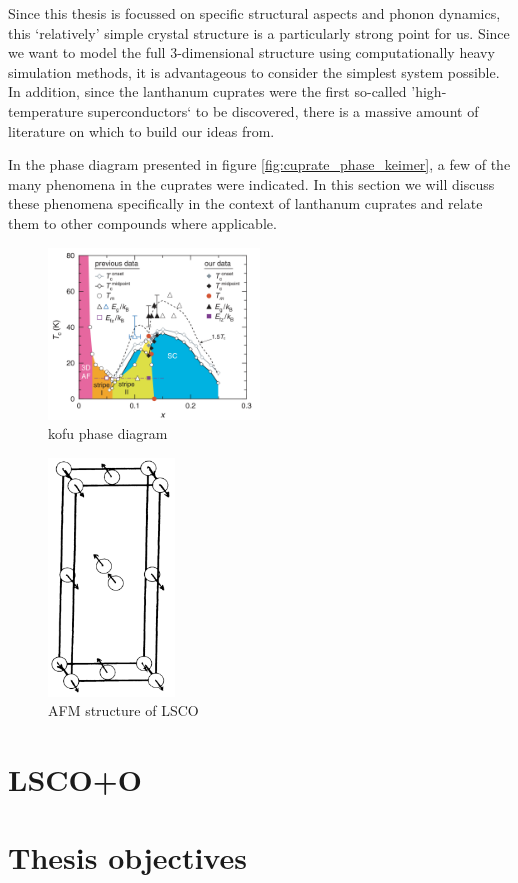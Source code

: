 Since this thesis is focussed on specific structural aspects and phonon dynamics, this `relatively' simple crystal structure is a particularly strong point for us. Since we want to model the full 3-dimensional structure using computationally heavy simulation methods, it is advantageous to consider the simplest system possible. In addition, since the lanthanum cuprates were the first so-called 'high-temperature superconductors` to be discovered, there is a massive amount of literature on which to build our ideas from.  

In the phase diagram presented in figure \ref{fig:cuprate_phase_keimer}, a few of the many phenomena in the cuprates were indicated. In this section we will discuss these phenomena specifically in the context of lanthanum cuprates and relate them to other compounds where applicable. 

\begin{figure}
    \centering
    \includegraphics[width=0.5\textwidth]{fig/intro/kofu_phase.png}
    \caption[kofu phase diagram]{kofu phase diagram}
    \label{fig:kofu_phase}
\end{figure}


\begin{figure}
    \centering
    \includegraphics[width=0.3\textwidth]{fig/lsco/lsco_afm.png}
    \caption[AFM structure of LSCO]{AFM structure of LSCO}
    \label{fig:lsco_afm}
\end{figure}

\section{LSCO+O}\label{sec:lscoo}

\section{Thesis objectives}
